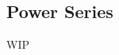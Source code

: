 \documentclass[../poma-notes.tex]{subfiles}
\begin{document}
\subsection*{Power Series}

WIP
\end{document}
